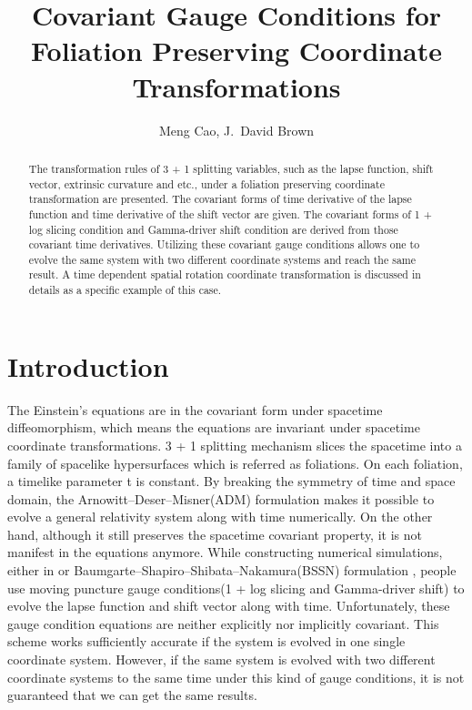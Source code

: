 \documentclass[letterpaper,nofootinbib,prd,amsmath,onecolumn]{revtex4-1}
\begin{document}

\title{Covariant Gauge Conditions for Foliation Preserving Coordinate Transformations}
\author{Meng Cao, J.~David Brown}

\begin{abstract}
The transformation rules of 3 + 1 splitting variables, such as the lapse function, shift vector, extrinsic curvature and etc., under a foliation preserving coordinate transformation are presented. The covariant forms of time derivative of the lapse function and time derivative of the shift vector are given. The covariant forms of 1 + log slicing condition and Gamma-driver shift condition are derived from those covariant time derivatives. Utilizing these covariant gauge conditions allows one to evolve the same system with two different coordinate systems and reach the same result. A time dependent spatial rotation coordinate transformation is discussed in details as a specific example of this case.  
\end{abstract}
\maketitle

\section{Introduction}
The Einstein's equations are in the covariant form under spacetime diffeomorphism, which means the equations are invariant under spacetime coordinate transformations. 3 + 1 splitting mechanism slices the spacetime into a family of spacelike hypersurfaces which is referred as foliations. On each foliation, a timelike parameter t is constant. By breaking the symmetry of time and space domain, the  Arnowitt--Deser--Misner(ADM) formulation \cite{ADM:Witten} makes it possible to evolve a general relativity system along with time numerically. On the other hand, although it still preserves the spacetime covariant property, it is not manifest in the equations anymore. While constructing numerical simulations, either in or Baumgarte--Shapiro--Shibata--Nakamura(BSSN) formulation \cite{Shibata:1995we,Baumgarte:1998te}, people use moving puncture gauge conditions(1 + log slicing and Gamma-driver shift)\cite{Bona:1994dr, Alcubierre:2002kk} to evolve the lapse function and shift vector along with time. Unfortunately, these gauge condition equations are neither explicitly nor implicitly covariant. This scheme works sufficiently accurate if the system is evolved in one single coordinate system. However, if the same system is evolved with two different coordinate systems to the same time under this kind of gauge conditions, it is not guaranteed that we can get the same results. 
\end{document}
